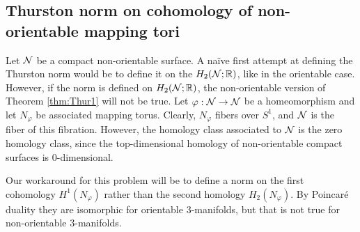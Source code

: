 \subsection{Thurston norm on cohomology of non-orientable mapping tori}
\label{sec:thurst-norm-cohom}

Let $\mathcal{N}$ be a compact non-orientable surface.
A na\"ive first attempt at defining the Thurston norm would be to define it on the $H_2(\mathcal{N};\mathbb{R})$, like in the orientable case.
However, if the norm is defined on $H_2(\mathcal{N};\mathbb{R})$, the non-orientable version of Theorem \ref{thm:Thur1} will not be true.
Let $\varphi: \mathcal{N} \to \mathcal{N}$ be a homeomorphism and let $N_{\varphi}$ be associated mapping torus.
Clearly, $N_{\varphi}$ fibers over $S^1$, and $\mathcal{N}$ is the fiber of this fibration.  However, the homology class associated to $\mathcal{N}$ is the zero homology class, since the top-dimensional homology of non-orientable compact surfaces is $0$-dimensional.

Our workaround for this problem will be to define a norm on the first cohomology $H^1(N_{\varphi})$ rather than the second homology $H_2(N_{\varphi})$.
By Poincar\'e duality they are isomorphic for orientable 3-manifolds, but that is not true for non-orientable $3$-manifolds.






